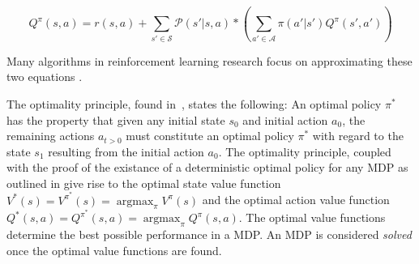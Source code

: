 \documentclass{../main.tex}{}
\begin{document}
\begin{equation}\label{equation:bellman:action-value-function}
Q^{\pi}(s, a) = r(s, a) + \sum_{s' \in \mathcal{S}} \mathcal{P}(s' | s, a) * (\sum_{a' \in \mathcal{A}} \pi(a' | s') Q^{\pi}(s', a'))
\end{equation}

Many algorithms in reinforcement learning research focus on approximating these two equations \citep{Tamar2017, Watkins1992, Mnih2013, Bertsekas2007}.

The optimality principle, found in~\cite{Bellman1957}, states the following: An optimal policy $\pi^*$ has the property that given any initial state $s_0$ and initial action $a_0$, the remaining actions $a_{t>0}$ must constitute an optimal policy $\pi^*$ with regard to the state $s_1$ resulting from the initial action $a_0$. The optimality principle, coupled with the proof of the existance of a deterministic optimal policy for any MDP as outlined in \citep{Borkar1988} give rise to the optimal state value function $V^{*}(s) = V^{\pi^{*}}(s) = \operatorname*{argmax}_{\pi} V^{\pi}(s)$ and the optimal action value function $Q^{*}(s,a) = Q^{\pi^{*}}(s, a) = \operatorname*{argmax}_{\pi} Q^{\pi}(s, a)$. The optimal value functions determine the best possible performance in a MDP\@. An MDP is considered \textit{solved} once the optimal value functions are found. 
\end{document}
